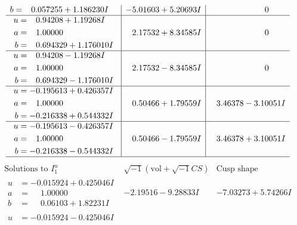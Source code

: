 \documentclass[1p]{elsarticle_modified}
\theoremstyle{definition}
\newcommand{\I}{\sqrt{-1}}
\begin{document}
$$\begin{array}{c|c|c}
\begin{aligned}
b &= \phantom{-}0.057255 + 1.186230 I\end{aligned}
 & -5.01603 + 5.20693 I & \phantom{-0.000000 } 0 \\ \hline\begin{aligned}
u &= \phantom{-}0.94208 + 1.19268 I \\
a &= \phantom{-}1.00000\phantom{ +0.000000I} \\
b &= \phantom{-}0.694329 + 1.176010 I\end{aligned}
 & \phantom{-}2.17532 + 8.34585 I & \phantom{-0.000000 } 0 \\ \hline\begin{aligned}
u &= \phantom{-}0.94208 - 1.19268 I \\
a &= \phantom{-}1.00000\phantom{ +0.000000I} \\
b &= \phantom{-}0.694329 - 1.176010 I\end{aligned}
 & \phantom{-}2.17532 - 8.34585 I & \phantom{-0.000000 } 0 \\ \hline\begin{aligned}
u &= -0.195613 + 0.426357 I \\
a &= \phantom{-}1.00000\phantom{ +0.000000I} \\
b &= -0.216338 + 0.544332 I\end{aligned}
 & \phantom{-}0.50466 + 1.79559 I & \phantom{-}3.46378 - 3.10051 I \\ \hline\begin{aligned}
u &= -0.195613 - 0.426357 I \\
a &= \phantom{-}1.00000\phantom{ +0.000000I} \\
b &= -0.216338 - 0.544332 I\end{aligned}
 & \phantom{-}0.50466 - 1.79559 I & \phantom{-}3.46378 + 3.10051 I\\
 \hline 
 \end{array}$$\newpage$$\begin{array}{c|c|c}  
\text{Solutions to }I^u_{1}& \I (\text{vol} + \sqrt{-1}CS) & \text{Cusp shape}\\
 \hline 
\begin{aligned}
u &= -0.015924 + 0.425046 I \\
a &= \phantom{-}1.00000\phantom{ +0.000000I} \\
b &= \phantom{-}0.06103 + 1.82231 I\end{aligned}
 & -2.19516 - 9.28833 I & -7.03273 + 5.74266 I \\ \hline\begin{aligned}
u &= -0.015924 - 0.425046 I \\

\end{aligned}
\end{array}$$
\end{document}
